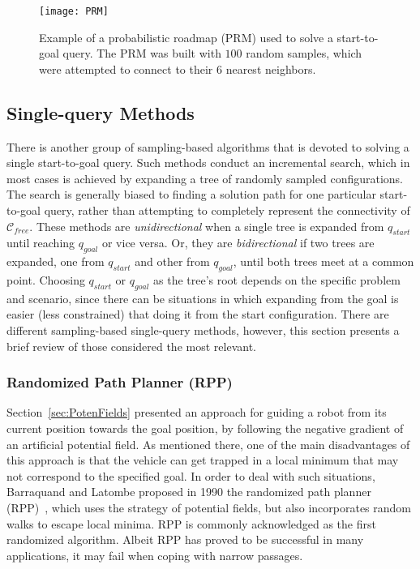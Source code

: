 \begin{figure}[htbp]
	\centering
	\texttt{[image: PRM]} \quad
\caption[Example of a probabilistic roadmap (PRM) used to solve a start-to-goal
query.]
{Example of a probabilistic roadmap (PRM) used to solve a start-to-goal query.
The PRM was built with $100$ random samples, which were attempted to connect to
their $6$ nearest neighbors.}
\label{fig:PRM}
\end{figure}

\subsection{Single-query Methods}

There is another group of sampling-based algorithms that is devoted to solving a
single start-to-goal query. Such methods conduct an incremental search, which in
most cases is achieved by expanding a tree of randomly sampled configurations.
The search is generally biased to finding a solution path for one particular
start-to-goal query, rather than attempting to completely represent the
connectivity of $\mathcal{C}_{free}$. These methods are \textit{unidirectional}
when a single tree is expanded from $q_{start}$ until reaching $q_{goal}$ or
vice versa. Or, they are \textit{bidirectional} if two trees are expanded, one
from $q_{start}$ and other from $q_{goal}$, until both trees meet at a common
point. Choosing $q_{start}$ or $q_{goal}$ as the tree's root depends on the
specific problem and scenario, since there can be situations in which expanding
from the goal is easier (less constrained) that doing it from the start
configuration. There are different sampling-based single-query methods, however,
this section presents a brief review of those considered the most relevant.

\subsubsection{Randomized Path Planner (RPP)}

Section~\ref{sec:PotenFields} presented an approach for guiding a robot from its
current position towards the goal position, by following the negative gradient
of an artificial potential field. As mentioned there, one of the main
disadvantages of this approach is that the vehicle can get trapped in a local
minimum that may not correspond to the specified goal. In order to deal with
such situations, Barraquand and Latombe proposed in 1990 the randomized path
planner (\ac{RPP})~\cite{Barraquand1990,Barraquand1991}, which uses the strategy
of potential fields, but also incorporates random walks to escape local minima.
\ac{RPP} is commonly acknowledged as the first randomized algorithm. Albeit
\ac{RPP} has proved to be successful in many applications, it may fail when
coping with narrow passages.

